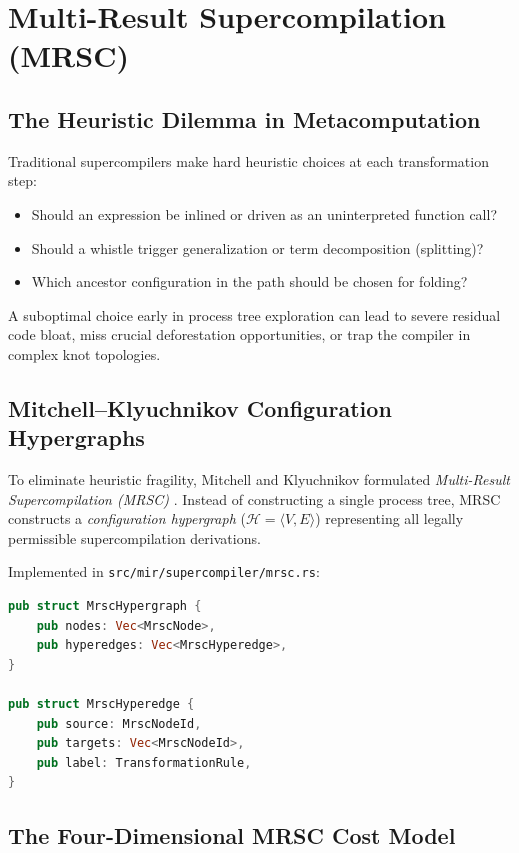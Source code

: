 \chapter{Multi-Result Supercompilation (MRSC)}
\label{chap:mrsc}

\section{The Heuristic Dilemma in Metacomputation}
\label{sec:mrsc:dilemma}

Traditional supercompilers make hard heuristic choices at each transformation step:
\begin{itemize}
    \item Should an expression be inlined or driven as an uninterpreted function call?
    \item Should a whistle trigger generalization or term decomposition (splitting)?
    \item Which ancestor configuration in the path should be chosen for folding?
\end{itemize}
A suboptimal choice early in process tree exploration can lead to severe residual code bloat, miss crucial deforestation opportunities, or trap the compiler in complex knot topologies.

\section{Mitchell--Klyuchnikov Configuration Hypergraphs}
\label{sec:mrsc:hypergraphs}

To eliminate heuristic fragility, Mitchell and Klyuchnikov formulated \emph{Multi-Result Supercompilation (MRSC)} \citep{klyuchnikov2012practical}. Instead of constructing a single process tree, MRSC constructs a \emph{configuration hypergraph} ($\mathcal{H} = \langle V, E \rangle$) representing all legally permissible supercompilation derivations.

Implemented in \texttt{src/mir/supercompiler/mrsc.rs}:
\begin{lstlisting}[language=Rust, caption={The MRSC Hypergraph structures in NumLang.}]
pub struct MrscHypergraph {
    pub nodes: Vec<MrscNode>,
    pub hyperedges: Vec<MrscHyperedge>,
}

pub struct MrscHyperedge {
    pub source: MrscNodeId,
    pub targets: Vec<MrscNodeId>,
    pub label: TransformationRule,
}
\end{lstlisting}

\section{The Four-Dimensional MRSC Cost Model}
\label{sec:mrsc:cost_model}

